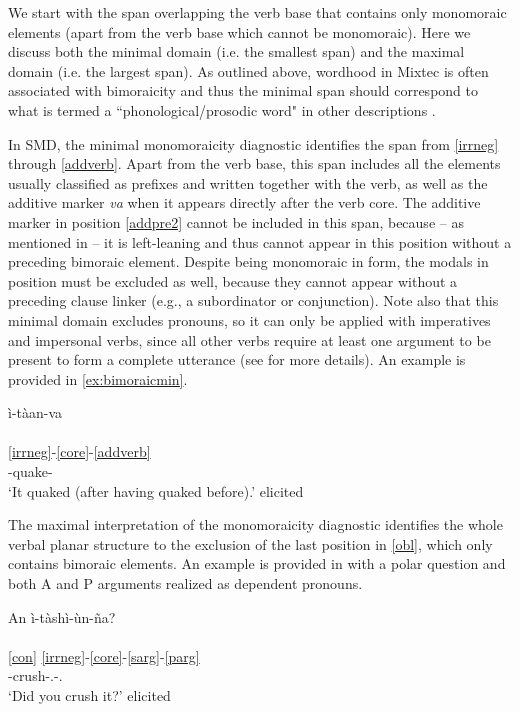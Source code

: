 \documentclass[output=paper]{langscibook}
\begin{document}
We start with the span overlapping the verb base that contains only mono\-mo\-ra\-ic elements (apart from the verb base which cannot be monomoraic). Here we discuss both the minimal domain (i.e. the smallest span) and the maximal domain (i.e. the largest span).
As outlined above, wordhood in Mixtec is often associated with bimoraicity and thus the minimal span should correspond to what is termed a ``phonological/prosodic word" in other descriptions \citep{uchihara2021minimality,penner2019prosodic}.

In SMD, the minimal monomoraicity diagnostic identifies the span from \ref{irrneg} through \ref{addverb}. Apart from the verb base, this span includes all the elements usually classified as prefixes and written together with the verb, as well as the additive marker \textit{va} when it appears directly after the verb core. 
The additive marker in position \ref{addpre2} cannot be included in this span, because -- as mentioned in  -- it is left-leaning and thus cannot appear in this position without a preceding bimoraic element.
Despite being monomoraic in form, the modals in position  must be excluded as well, because they cannot appear without a preceding clause linker (e.g., a subordinator or conjunction).
Note also that this minimal domain excludes pronouns, so it can only be applied with imperatives and impersonal verbs, since all other verbs require at least one argument to be present to form a complete utterance (see  for more details). An  example is provided in \ref{ex:bimoraicmin}.

\ea \label{ex:bimoraicmin}
    \gllll ì-tàan-va \\
        [i¹-tãː¹³-βa³] \\
        \ref{irrneg}-\ref{core}-\ref{addverb} \\
        \Cmpl-quake-\Add{} \\
    \glt `It quaked (after having quaked before).' \hfill elicited
\z

The maximal interpretation of the monomoraicity diagnostic identifies the whole verbal planar structure to the exclusion of the last position in \ref{obl}, which only contains bimoraic elements. An example is provided in  with a polar question and both A and P arguments realized as dependent pronouns.

\ea \label{ex:bimoraicmax}
    \gllll An ì-tàshì-ùn-ña? \\
        [ã³ i¹-ta¹ʃi¹-ũ¹-ɲa³] \\
        \ref{con} \ref{irrneg}-\ref{core}-\ref{sarg}-\ref{parg} \\
        \Q{} \Cmpl-crush-\Ssg.\Nhon-\Third.\Thing{} \\
    \glt `Did you crush it?' \hfill elicited
\z
\end{document}
